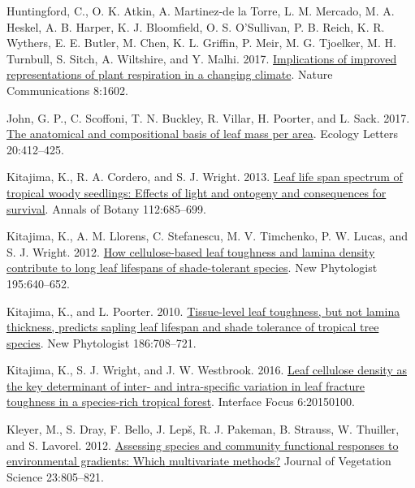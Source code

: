 \documentclass[
  12pt,
]{article}
\newlength{\cslhangindent} %
\newlength{\cslentryspacingunit} %
\newenvironment{CSLReferences}[2] %
 {%
  \setlength{\parindent}{0pt} %
  \ifodd #1 %
  \let\oldpar\par %
  \def\par{\hangindent=\cslhangindent\oldpar} %
  \fi %
  \setlength{\parskip}{#2\cslentryspacingunit} %
 }%
 {} %
\begin{document}
\begin{CSLReferences}{1}{0}
\leavevmode{}%
Huntingford, C., O. K. Atkin, A. Martinez-de la Torre, L. M. Mercado, M. A. Heskel, A. B. Harper, K. J. Bloomfield, O. S. O'Sullivan, P. B. Reich, K. R. Wythers, E. E. Butler, M. Chen, K. L. Griffin, P. Meir, M. G. Tjoelker, M. H. Turnbull, S. Sitch, A. Wiltshire, and Y. Malhi. 2017. \href{https://doi.org/10.1038/s41467-017-01774-z}{Implications of improved representations of plant respiration in a changing climate}. Nature Communications 8:1602.

\leavevmode{}%
John, G. P., C. Scoffoni, T. N. Buckley, R. Villar, H. Poorter, and L. Sack. 2017. \href{https://doi.org/10.1111/ele.12739}{The anatomical and compositional basis of leaf mass per area}. Ecology Letters 20:412--425.

\leavevmode{}%
Kitajima, K., R. A. Cordero, and S. J. Wright. 2013. \href{https://doi.org/10.1093/aob/mct036}{Leaf life span spectrum of tropical woody seedlings: {Effects} of light and ontogeny and consequences for survival}. Annals of Botany 112:685--699.

\leavevmode{}%
Kitajima, K., A. M. Llorens, C. Stefanescu, M. V. Timchenko, P. W. Lucas, and S. J. Wright. 2012. \href{https://doi.org/10.1111/j.1469-8137.2012.04203.x}{How cellulose-based leaf toughness and lamina density contribute to long leaf lifespans of shade-tolerant species}. New Phytologist 195:640--652.

\leavevmode{}%
Kitajima, K., and L. Poorter. 2010. \href{https://doi.org/10.1111/j.1469-8137.2010.03212.x}{Tissue-level leaf toughness, but not lamina thickness, predicts sapling leaf lifespan and shade tolerance of tropical tree species}. New Phytologist 186:708--721.

\leavevmode{}%
Kitajima, K., S. J. Wright, and J. W. Westbrook. 2016. \href{https://doi.org/10.1098/rsfs.2015.0100}{Leaf cellulose density as the key determinant of inter- and intra-specific variation in leaf fracture toughness in a species-rich tropical forest}. Interface Focus 6:20150100.

\leavevmode{}%
Kleyer, M., S. Dray, F. Bello, J. Lepš, R. J. Pakeman, B. Strauss, W. Thuiller, and S. Lavorel. 2012. \href{https://doi.org/10.1111/j.1654-1103.2012.01402.x}{Assessing species and community functional responses to environmental gradients: {Which} multivariate methods?} Journal of Vegetation Science 23:805--821.


\end{CSLReferences}
\end{document}
